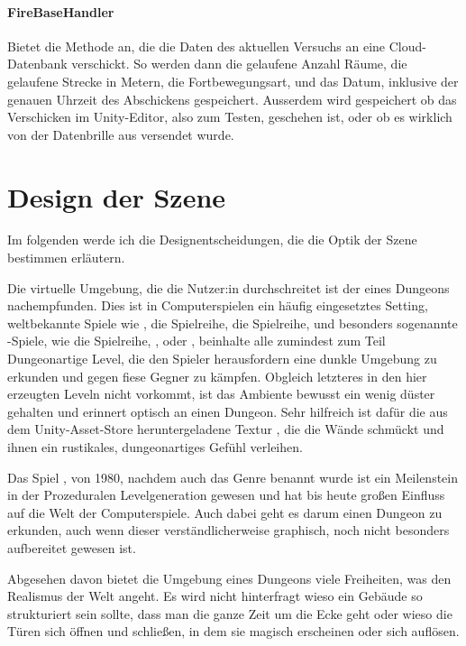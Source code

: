 \begin{multicols*}{2}
    \paragraph{FireBaseHandler}
    Bietet die Methode  an, die die Daten des aktuellen Versuchs an eine Cloud-Datenbank verschickt. So werden dann die gelaufene Anzahl Räume, die gelaufene Strecke in Metern, die Fortbewegungsart, und das Datum, inklusive der genauen Uhrzeit des Abschickens gespeichert. Ausserdem wird gespeichert ob das Verschicken im Unity-Editor, also zum Testen, geschehen ist, oder ob es wirklich von der Datenbrille aus versendet wurde.
\end{multicols*}

\section{Design der Szene}
Im folgenden werde ich die Designentscheidungen, die die Optik der Szene bestimmen erläutern.

Die virtuelle Umgebung, die die Nutzer:in durchschreitet ist der eines Dungeons nachempfunden. Dies ist in Computerspielen ein häufig eingesetztes Setting, weltbekannte Spiele wie
, %
die  Spielreihe,
die  Spielreihe,
und besonders sogenannte -Spiele, wie
die  Spielreihe,
,
oder , beinhalte alle zumindest zum Teil Dungeonartige Level, die den Spieler herausfordern eine dunkle Umgebung zu erkunden und gegen fiese Gegner zu kämpfen.
Obgleich letzteres in den hier erzeugten Leveln nicht vorkommt, ist das  Ambiente bewusst ein wenig düster gehalten und erinnert optisch an einen Dungeon. Sehr hilfreich ist dafür die aus dem Unity-Asset-Store heruntergeladene Textur \cite{dungeon-material}, die die Wände schmückt und ihnen ein rustikales, dungeonartiges Gefühl verleihen.

Das Spiel , von 1980, nachdem auch das Genre  benannt wurde ist ein Meilenstein in der Prozeduralen Levelgeneration gewesen und hat bis heute großen Einfluss auf die Welt der Computerspiele. Auch dabei geht es darum einen Dungeon zu erkunden, auch wenn dieser verständlicherweise graphisch, noch nicht besonders aufbereitet gewesen ist.

Abgesehen davon bietet die Umgebung eines Dungeons viele Freiheiten, was den Realismus der Welt angeht. Es wird nicht hinterfragt wieso ein Gebäude so strukturiert sein sollte, dass man die ganze Zeit um die Ecke geht oder wieso die Türen sich öffnen und schließen, in dem sie magisch erscheinen oder sich auflösen.

